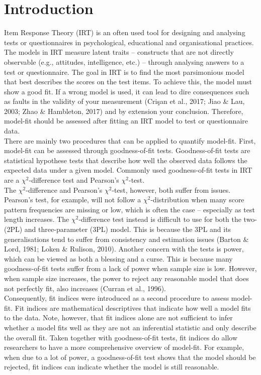 \documentclass[Royal,sageapa,times,doublespace]{sagej}
\begin{document}
\section{Introduction}
Item Response Theory (IRT) is an often used tool for designing and analysing tests or questionnaires in psychological, educational and organisational practices. The models in IRT measure latent traits -- constructs that are not directly observable (e.g., attitudes, intelligence, etc.) -- through analysing answers to a test or questionnaire. The goal in IRT is to find the most parsimonious model that best describes the scores on the test items. To achieve this, the model must show a good fit. If a wrong model is used, it can lead to dire consequences such as faults in the validity of your measurement (Cri\c{s}an et al., 2017; Jiao \& Lau, 2003; Zhao \& Hambleton, 2017) and by extension your conclusion. Therefore, model-fit should be assessed after fitting an IRT model to test or questionnaire data. \\
\indent There are mainly two procedures that can be applied to quantify model-fit. First, model-fit can be assessed through goodness-of-fit tests. Goodness-of-fit tests are statistical hypothese tests that describe how well the observed data follows the expected data under a given model. Commonly used goodness-of-fit tests in IRT are a $\chi^2$-difference test and Pearson's $\chi^2$-test. \\
\indent The $\chi^2$-difference and Pearson's $\chi^2$-test, however, both suffer from issues. Pearson's test, for example, will not follow a $\chi^2$-distribution when many score pattern frequencies are missing or low, which is often the case -- especially as test length increases. The $\chi^2$-difference test instead is difficult to use for both the two- (2PL) and three-parameter (3PL) model. This is because the 3PL and its generalisations tend to suffer from consistency and estimation issues (Barton \& Lord, 1981; Loken \& Rulison, 2010). Another concern with the tests is power, which can be viewed as both a blessing and a curse. This is because many goodness-of-fit tests suffer from a lack of power when sample size is low. However, when sample size increases, the power to reject any reasonable model that does not perfectly fit, also increases (Curran et al., 1996). \\
\indent Consequently, fit indices were introduced as a second procedure to assess model-fit. Fit indices are mathematical descriptives that indicate how well a model fits to the data. Note, however, that fit indices alone are not sufficient to infer whether a model fits well as they are not an inferential statistic and only describe the overall fit. Taken together with goodness-of-fit tests, fit indices do allow researchers to have a more comprehensive overview of model-fit. For example, when due to a lot of power, a goodness-of-fit test shows that the model should be rejected, fit indices can indicate whether the model is still reasonable. \\ 
\end{document}
